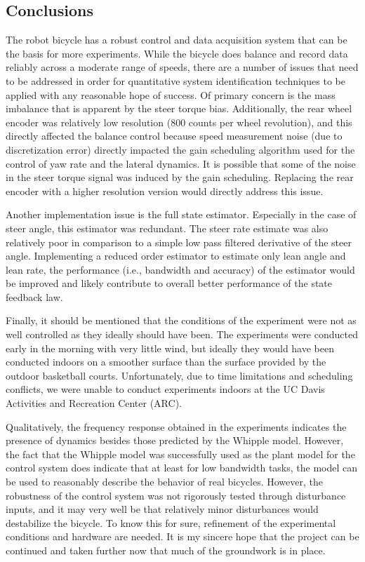 \subsection{Conclusions} \label{rb:subsec:conclusions}
The robot bicycle has a robust control and data acquisition system that can be
the basis for more experiments. While the bicycle does balance and record data
reliably across a moderate range of speeds, there are a number of issues that
need to be addressed in order for quantitative system identification techniques
to be applied with any reasonable hope of success. Of primary concern is the
mass imbalance that is apparent by the steer torque bias. Additionally, the
rear wheel encoder was relatively low resolution (800 counts per wheel
revolution), and this directly affected the balance control because speed
measurement noise (due to discretization error) directly impacted the gain
scheduling algorithm used for the control of yaw rate and the lateral dynamics.
It is possible that some of the noise in the steer torque signal was induced by
the gain scheduling. Replacing the rear encoder with a higher resolution
version would directly address this issue.

Another implementation issue is the full state estimator. Especially in the
case of steer angle, this estimator was redundant. The steer rate estimate was
also relatively poor in comparison to a simple low pass filtered derivative of
the steer angle. Implementing a reduced order estimator to estimate only lean
angle and lean rate, the performance (i.e., bandwidth and accuracy) of the
estimator would be improved and likely contribute to overall better performance
of the state feedback law.

Finally, it should be mentioned that the conditions of the experiment were not
as well controlled as they ideally should have been. The experiments were
conducted early in the morning with very little wind, but ideally they would
have been conducted indoors on a smoother surface than the surface provided by
the outdoor basketball courts. Unfortunately, due to time limitations and
scheduling conflicts, we were unable to conduct experiments indoors at the UC
Davis Activities and Recreation Center (ARC).

Qualitatively, the frequency response obtained in the experiments indicates the
presence of dynamics besides those predicted by the Whipple model.  However,
the fact that the Whipple model was successfully used as the plant model for
the control system does indicate that at least for low bandwidth tasks, the
model can be used to reasonably describe the behavior of real bicycles.
However, the robustness of the control system was not rigorously tested through
disturbance inputs, and it may very well be that relatively minor disturbances
would destabilize the bicycle. To know this for sure, refinement of the
experimental conditions and hardware are needed. It is my sincere hope that the
project can be continued and taken further now that much of the groundwork is
in place.

